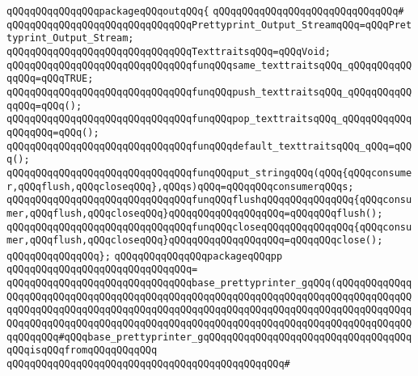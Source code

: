\verb|qQQqqQQqqQQqqQQqpackageqQQqoutqQQq{|\newline
\verb|qQQqqQQqqQQqqQQqqQQqqQQqqQQqqQQq#|\newline
\verb|qQQqqQQqqQQqqQQqqQQqqQQqqQQqqQQqPrettyprint_Output_StreamqQQq=qQQqPrettyprint_Output_Stream;|\newline
\verb|qQQqqQQqqQQqqQQqqQQqqQQqqQQqqQQqTexttraitsqQQq=qQQqVoid;|\newline
\newline
\verb|qQQqqQQqqQQqqQQqqQQqqQQqqQQqqQQqfunqQQqsame_texttraitsqQQq_qQQqqQQqqQQqqQQq=qQQqTRUE;|\newline
\verb|qQQqqQQqqQQqqQQqqQQqqQQqqQQqqQQqfunqQQqpush_texttraitsqQQq_qQQqqQQqqQQqqQQq=qQQq();|\newline
\verb|qQQqqQQqqQQqqQQqqQQqqQQqqQQqqQQqfunqQQqpop_texttraitsqQQq_qQQqqQQqqQQqqQQqqQQq=qQQq();|\newline
\verb|qQQqqQQqqQQqqQQqqQQqqQQqqQQqqQQqfunqQQqdefault_texttraitsqQQq_qQQq=qQQq();|\newline
\newline
\verb|qQQqqQQqqQQqqQQqqQQqqQQqqQQqqQQqfunqQQqput_stringqQQq(qQQq{qQQqconsumer,qQQqflush,qQQqcloseqQQq},qQQqs)qQQq=qQQqqQQqconsumerqQQqs;|\newline
\newline
\verb|qQQqqQQqqQQqqQQqqQQqqQQqqQQqqQQqfunqQQqflushqQQqqQQqqQQqqQQq{qQQqconsumer,qQQqflush,qQQqcloseqQQq}qQQqqQQqqQQqqQQqqQQq=qQQqqQQqflush();|\newline
\verb|qQQqqQQqqQQqqQQqqQQqqQQqqQQqqQQqfunqQQqcloseqQQqqQQqqQQqqQQq{qQQqconsumer,qQQqflush,qQQqcloseqQQq}qQQqqQQqqQQqqQQqqQQq=qQQqqQQqclose();|\newline
\verb|qQQqqQQqqQQqqQQq};|\newline
\newline
\verb|qQQqqQQqqQQqqQQqpackageqQQqpp|\newline
\verb|qQQqqQQqqQQqqQQqqQQqqQQqqQQqqQQq=|\newline
\verb|qQQqqQQqqQQqqQQqqQQqqQQqqQQqqQQqbase_prettyprinter_gqQQq(qQQqqQQqqQQqqQQqqQQqqQQqqQQqqQQqqQQqqQQqqQQqqQQqqQQqqQQqqQQqqQQqqQQqqQQqqQQqqQQqqQQqqQQqqQQqqQQqqQQqqQQqqQQqqQQqqQQqqQQqqQQqqQQqqQQqqQQqqQQqqQQqqQQqqQQqqQQqqQQqqQQqqQQqqQQqqQQqqQQqqQQqqQQqqQQqqQQqqQQqqQQqqQQqqQQqqQQqqQQqqQQqqQQqqQQq#qQQqbase_prettyprinter_gqQQqqQQqqQQqqQQqqQQqqQQqqQQqqQQqqQQqqQQqisqQQqfromqQQqqQQqqQQq|\newline
\verb|qQQqqQQqqQQqqQQqqQQqqQQqqQQqqQQqqQQqqQQqqQQqqQQq#|\newline
